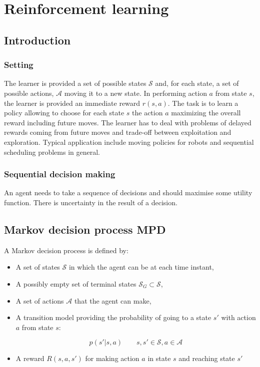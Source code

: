 \chapter{Reinforcement learning}

\section{Introduction}

	\subsection{Setting}
	The learner is provided a set of possible states $\mathcal{S}$ and, for each state, a set of possible actions, $\mathcal{A}$ moving it to a new state.
	In performing action $a$ from state $s$, the learner is provided an immediate reward $r(s,a)$.
	The task is to learn a policy allowing to choose for each state $s$ the action $a$ maximizing the overall reward including future moves.
	The learner has to deal with problems of delayed rewards coming from future moves and trade-off between exploitation and exploration.
	Typical application include moving policies for robots and sequential scheduling problems in general.

	\subsection{Sequential decision making}
	An agent needs to take a sequence of decisions and should maximise some utility function.
	There is uncertainty in the result of a decision.

\section{Markov decision process MPD}
A Markov decision process is defined by:

\begin{itemize}
	\item A set of states $\mathcal{S}$ in which the agent can be at each time instant,
	\item A possibly empty set of terminal states $\mathcal{S}_G\subset\mathcal{S}$,
	\item A set of actions $\mathcal{A}$ that the agent can make,
	\item A transition model providing the probability of going to a state $s'$ with action $a$ from state $s$:

		$$p(s'|s,a)\qquad s,s'\in\mathcal{S},a\in\mathcal{A}$$

	\item A reward $R(s,a,s')$ for making action $a$ in state $s$ and reaching state $s'$
\end{itemize}

